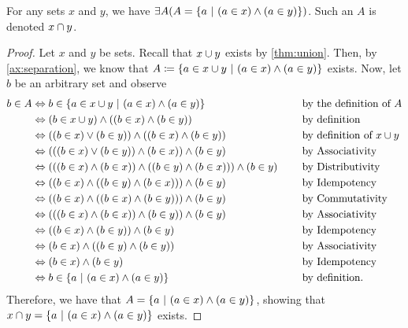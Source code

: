 \begin{theorem}\label{thm:intersection}
    For any sets \(x\) and \(y\), we have \(\exists A \pn*{A = \set*{a \suchthat (a \in x) \meet (a \in y)}}\).
    Such an \(A\) is denoted \(x \cap y\).
\end{theorem}
\begin{proof}
    Let \(x\) and \(y\) be sets. Recall that \(x \cup y\) exists by \autoref{thm:union}.
    Then, by \autoref{ax:separation},
    we know that \(A \defn \set*{a \in x \union y \suchthat (a \in x) \meet (a \in y)}\) exists.
    Now, let \(b\) be an arbitrary set and observe
    \begin{alignat*}{2}
        b \in A &\iff b \in \set*{a \in x \union y \suchthat (a \in x) \meet (a \in y)} &&\text{by the definition of \(A\)} \\
                &\iff (b \in x \union y) \meet \pn*{(b \in x) \meet (b \in y)} &&\text{by definition} \\
                &\iff \pn*{(b \in x) \join (b \in y)} \meet \pn*{(b \in x) \meet (b \in y)} &&\text{by definition of } x \union y \\
                &\iff \pn*{\pn*{(b \in x) \join (b \in y)} \meet (b \in x)} \meet (b \in y) &&\text{by Associativity} \\
                &\iff \pn*{\pn*{(b \in x) \meet (b \in x)} \meet \pn*{(b \in y) \meet (b \in x)}} \meet (b \in y)~~~~&&\text{by Distributivity} \\
                &\iff \pn*{(b \in x) \meet \pn*{(b \in y) \meet (b \in x)}} \meet (b \in y) &&\text{by Idempotency} \\
                &\iff \pn*{(b \in x) \meet \pn*{(b \in x) \meet (b \in y)}} \meet (b \in y) &&\text{by Commutativity} \\
                &\iff \pn*{\pn*{(b \in x) \meet (b \in x)} \meet (b \in y)} \meet (b \in y) &&\text{by Associativity} \\
                &\iff \pn*{(b \in x) \meet (b \in y)} \meet (b \in y) &&\text{by Idempotency} \\
                &\iff (b \in x) \meet \pn*{(b \in y) \meet (b \in y)} &&\text{by Associativity} \\
                &\iff (b \in x) \meet (b \in y) &&\text{by Idempotency} \\
                &\iff b \in \set*{a \suchthat (a \in x) \meet (a \in y)} &&\text{by definition}.
    \end{alignat*}
    Therefore, we have that \(A = \set*{a \suchthat (a \in x) \meet (a \in y)}\),
    showing that \(x \intersection y = \set*{a \suchthat (a \in x) \meet (a \in y)}\) exists.
\end{proof}




